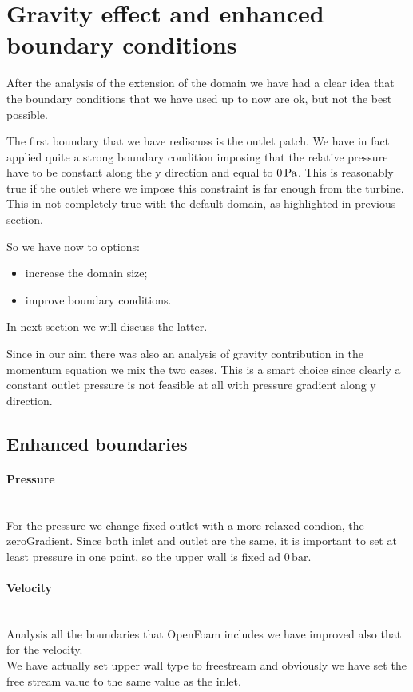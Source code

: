 \documentclass[a4paper,12pt]{article}
\begin{document}
\section{Gravity effect and enhanced boundary conditions}

After the analysis of the extension of the domain we have had a clear idea that the boundary conditions that we have used up to now are ok, 
but not the best possible.

The first boundary that we have rediscuss is the outlet patch. We have in fact applied quite a strong boundary condition imposing that the relative pressure have to be constant along the y direction and equal to $0\,\text{Pa}$. This is reasonably true if the outlet where we impose this constraint is far enough from the turbine. This in not completely true with the default domain, as highlighted in previous section.

So we have now to options:
\begin{itemize}
\item increase the domain size;
\item improve boundary conditions.
\end{itemize}  
In next section we will discuss the latter.

Since in our aim there was also an analysis of gravity contribution in the momentum equation we mix the two cases.
This is a smart choice since clearly a constant outlet pressure is not feasible at all with pressure gradient along y direction.

\subsection{Enhanced boundaries}

\paragraph{Pressure} \mbox{}\\
For the pressure we change fixed outlet with a more relaxed condion, the zeroGradient.
Since both inlet and outlet are the same, it is important to set at least pressure in one point, so the upper wall is fixed ad $0\,\text{bar}$.

\paragraph{Velocity} \mbox{}\\
Analysis all the boundaries that OpenFoam includes we have improved also that for the velocity.\\
We have actually set upper wall type to freestream and obviously we have set the free stream value to the same value as the inlet.
\end{document}
